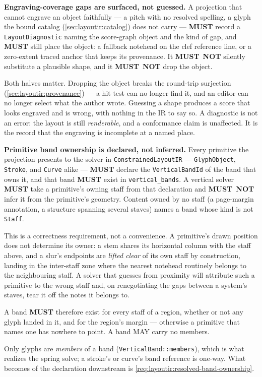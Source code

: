 \documentclass[11pt,letterpaper]{report}
\newcounter{requirement}[chapter]
\newcommand{\MUST}{\textbf{MUST}}
\newcommand{\MUSTNOT}{\textbf{MUST}\nobreak\ \textbf{NOT}}
\begin{document}
\begin{requirement}
  \label{req:layoutir:coverage-diagnostics}
  \textbf{Engraving-coverage gaps are surfaced, not guessed.} A projection
  that cannot engrave an object faithfully --- a pitch with no resolved
  spelling, a glyph the bound catalog
  (\ref{sec:layoutir:catalog}) does not carry --- \MUST{} record a
  \texttt{LayoutDiagnostic} naming the score-graph object and the kind of
  gap, and \MUST{} still place the object: a fallback notehead on the clef
  reference line, or a zero-extent traced anchor that keeps its provenance.
  It \MUSTNOT{} silently substitute a plausible shape, and it \MUSTNOT{}
  drop the object.

  Both halves matter. Dropping the object breaks the round-trip surjection
  (\ref{sec:layoutir:provenance}) --- a hit-test can no longer find it, and
  an editor can no longer select what the author wrote. Guessing a shape
  produces a score that looks engraved and is wrong, with nothing in the IR
  to say so. A diagnostic is not an error: the layout is still
  \emph{renderable}, and a conformance claim is unaffected. It is the record
  that the engraving is incomplete at a named place.
\end{requirement}

\begin{requirement}
  \label{req:layoutir:primitive-band-ownership}
  \textbf{Primitive band ownership is declared, not inferred.} Every
  primitive the projection presents to the solver in
  \texttt{ConstrainedLayoutIR} --- \texttt{GlyphObject},
  \texttt{Stroke}, and \texttt{Curve} alike --- \MUST{} declare the
  \texttt{VerticalBandId} of the band that owns it, and that band
  \MUST{} exist in \texttt{vertical\_bands}. A vertical solver \MUST{}
  take a primitive's owning staff from that declaration and
  \MUSTNOT{} infer it from the primitive's geometry. Content owned by
  no staff (a page-margin annotation, a structure spanning several
  staves) names a band whose kind is not \texttt{Staff}.

  This is a correctness requirement, not a convenience. A primitive's
  drawn position does not determine its owner: a stem shares its
  horizontal column with the staff above, and a slur's endpoints are
  \emph{lifted clear} of its own staff by construction, landing in the
  inter-staff zone where the nearest notehead routinely belongs to the
  neighbouring staff. A solver that guesses from proximity will
  attribute such a primitive to the wrong staff and, on renegotiating
  the gaps between a system's staves, tear it off the notes it belongs
  to.

  A band \MUST{} therefore exist for every staff of a region, whether
  or not any glyph landed in it, and for the region's margin ---
  otherwise a primitive that names one has nowhere to point. A band
  MAY carry no members.

  Only glyphs are \emph{members} of a band
  (\texttt{VerticalBand::members}), which is what realizes the spring
  solve; a stroke's or curve's band reference is one-way. What becomes
  of the declaration downstream is
  \ref{req:layoutir:resolved-band-ownership}.
\end{requirement}
\end{document}
